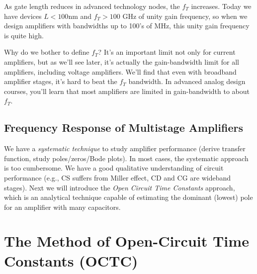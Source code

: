 As gate length reduces in advanced technology nodes, the $f_T$ increases.  Today we have devices $L < 100$nm and $f_T > 100$ GHz of unity gain frequency, so when we design amplifiers with bandwidths up to 100's of MHz, this unity gain frequency is quite high.

Why do we bother to define $f_T$?  It's an important limit not only for current amplifiers, but as we'll see later, it's actually the gain-bandwidth limit for all amplifiers, including voltage amplifiers.  We'll find that even with broadband amplifier stages, it's hard to beat the $f_T$ bandwidth.  In advanced analog design courses, you'll learn that  most amplifiers are limited in gain-bandwidth to about $f_T$. 
\subsection{Frequency Response of Multistage Amplifiers}
We have a \textit{systematic technique} to study amplifier performance (derive transfer function, study poles/zeros/Bode plots).  In most cases, the systematic approach is too cumbersome. We have a good qualitative understanding of circuit performance (e.g., CS suffers from Miller effect, CD and CG are wideband stages).  Next we will introduce the \textit{Open Circuit Time Constants} approach, which is an analytical technique capable of estimating  the dominant (lowest) pole for an amplifier with many capacitors.
\section{The Method of Open-Circuit Time Constants (OCTC)}
